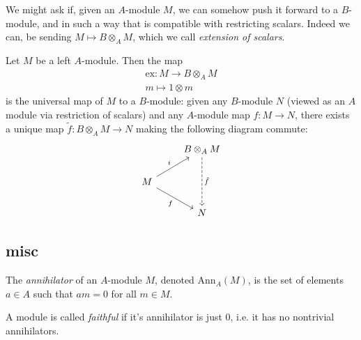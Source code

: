 \documentclass[12pt]{article}
\begin{document}
We might ask if, given an $A$-module $M$, we can somehow push it forward to a $B$-module, and in such a way that is compatible with restricting scalars. Indeed we can, be sending $M\mapsto B\otimes_A M$, which we call \emph{extension of scalars}.

\begin{proposition}
	Let $M$ be a left $A$-module. Then the map 
	\begin{gather*}
		\text{ex}: M\to B\otimes_A M \\
		m \mapsto 1\otimes m
	\end{gather*}
	is the universal map of $M$ to a $B$-module: given any $B$-module $N$ (viewed as an $A$ module via restriction of scalars) and any $A$-module map $f:M\to N$, there exists a unique map $\tilde{f}:B\otimes_A M\to N$ making the following diagram commute:
	\begin{equation*}
\begin{tikzcd}
                                   & B\otimes_A M \arrow[dd, "\tilde{f}", dashed] \\
M \arrow[ru, "i"] \arrow[rd, "f"'] &                                              \\
                                   & N                                           
\end{tikzcd}
	\end{equation*}
\end{proposition}



\subsection{misc} %

\begin{definition}
	The \emph{annihilator} of an $A$-module $M$, denoted $\text{Ann}_A(M)$, is the set of elements $a\in A$ such that $am=0$ for all $m\in M$.
\end{definition}

\begin{definition}
	A module is called \emph{faithful} if it's annihilator is just 0, i.e. it has no nontrivial annihilators.
\end{definition}
\end{document}
